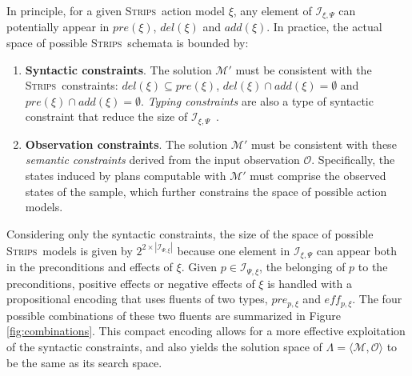 \documentclass[runningheads]{llncs}
\newcommand{\tup}[1]{{\langle #1 \rangle}}
\newcommand{\strips}{\textsc{Strips}}     %
\begin{document}
In principle, for a given \strips\ action model $\xi$, any element of ${\mathcal I}_{\xi,\Psi}$ can potentially appear in $pre(\xi)$, $del(\xi)$ and $add(\xi)$. In practice, the actual space of possible \strips\ schemata is bounded by:
\begin{enumerate}
\item {\bf Syntactic constraints}. The solution $\mathcal{M}'$ must be consistent with the \strips\ constraints: $del(\xi)\subseteq pre(\xi)$, $del(\xi)\cap add(\xi)=\emptyset$ and $pre(\xi)\cap add(\xi)=\emptyset$. {\em Typing constraints} are also a type of syntactic constraint that reduce the size of ${\mathcal I}_{\xi,\Psi}$~\cite{mcdermott1998pddl}.
\item {\bf Observation constraints}. The solution $\mathcal{M}'$ must be consistent with these \emph{semantic constraints} derived from the input observation $\mathcal{O}$. Specifically, the states induced by plans computable with $\mathcal{M}'$ must comprise the observed states of the sample, which further constrains the space of possible action models.
\end{enumerate}

Considering only the syntactic constraints, the size of the space of possible \strips\ models is given by $2^{2\times|{\mathcal I}_{\Psi,\xi}|}$ because one element in $\mathcal{I}_{\xi,\Psi}$ can appear both in the preconditions and effects of $\xi$. Given $p \in \mathcal{I}_{\Psi,\xi}$, the belonging of $p$ to the preconditions, positive effects or negative effects of $\xi$ is handled with a propositional encoding that uses fluents of two types, $pre_{p,\xi}$ and $eff_{p,\xi}$. The four possible combinations of these two fluents are summarized in Figure \ref{fig:combinations}. This compact encoding allows for a more effective exploitation of the syntactic constraints, and also yields the solution space of $\Lambda=\tup{\mathcal{M},{\mathcal O}}$ to be the same as its search space.
\end{document}
